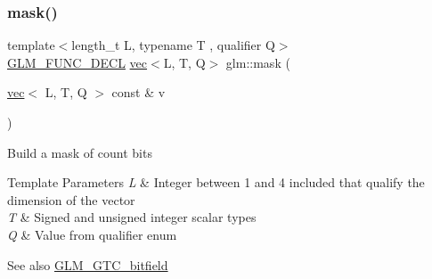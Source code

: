 \subsubsection{\texorpdfstring{mask()}{mask()}\hspace{0.1cm}{\footnotesize\ttfamily [2/2]}}
{\footnotesize\ttfamily template$<$length\+\_\+t L, typename T , qualifier Q$>$ \\
\mbox{\hyperlink{setup_8hpp_ab2d052de21a70539923e9bcbf6e83a51}{G\+L\+M\+\_\+\+F\+U\+N\+C\+\_\+\+D\+E\+CL}} \mbox{\hyperlink{structglm_1_1vec}{vec}}$<$L, T, Q$>$ glm\+::mask (\begin{DoxyParamCaption}\item[{\mbox{\hyperlink{structglm_1_1vec}{vec}}$<$ L, T, Q $>$ const \&}]{v }\end{DoxyParamCaption})}

Build a mask of \textquotesingle{}count\textquotesingle{} bits


\begin{DoxyTemplParams}{Template Parameters}
{\em L} & Integer between 1 and 4 included that qualify the dimension of the vector \\
\hline
{\em T} & Signed and unsigned integer scalar types \\
\hline
{\em Q} & Value from qualifier enum\\
\hline
\end{DoxyTemplParams}
\begin{DoxySeeAlso}{See also}
\mbox{\hyperlink{group__gtc__bitfield}{G\+L\+M\+\_\+\+G\+T\+C\+\_\+bitfield}} 
\end{DoxySeeAlso}
